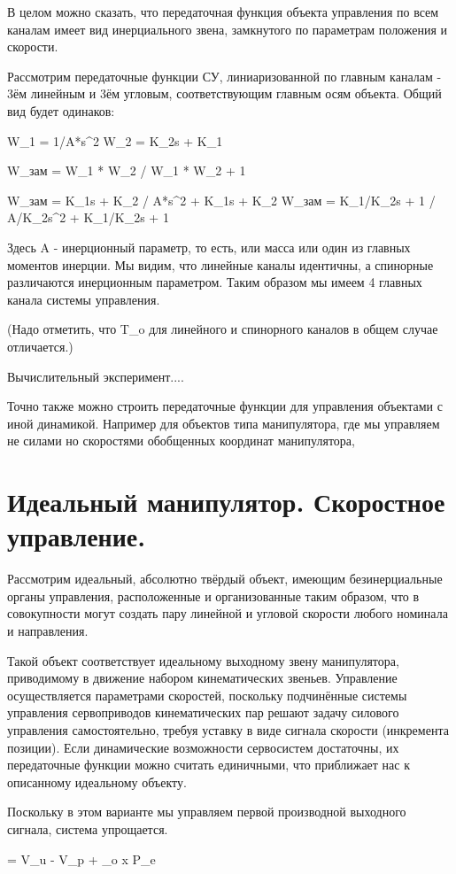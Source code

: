 \documentclass[a4paper]{article}
\begin{document}
В целом можно сказать, что передаточная функция объекта управления по всем каналам имеет вид инерциального звена, замкнутого по параметрам положения и скорости. 

Рассмотрим передаточные функции СУ, линиаризованной по главным каналам - 3ём линейным и 3ём угловым, соответствующим главным осям объекта. 
Общий вид будет одинаков:

W_1 = 1/A*s^2
W_2 = K_2s + K_1

W_зам = W_1 * W_2 / W_1 * W_2 + 1

W_зам = K_1s + K_2 / A*s^2 + K_1s + K_2
W_зам = K_1/K_2s + 1 / A/K_2s^2 + K_1/K_2s + 1

Здесь A - инерционный параметр, то есть, или масса или один из главных моментов инерции. Мы видим, что линейные каналы идентичны, а спинорные различаются инерционным параметром. Таким образом мы имеем 4 главных канала системы управления.

 (Надо отметить, что T_o для линейного и спинорного каналов в общем случае отличается.)

Вычислительный эксперимент....

Точно также можно строить передаточные функции для управления объектами с иной динамикой. Например для объектов типа манипулятора, где мы управляем не силами но скоростями обобщенных координат манипулятора,


\section{Идеальный манипулятор. Скоростное управление.}
Рассмотрим идеальный, абсолютно твёрдый объект, имеющим безинерциальные органы управления, расположенные и организованные таким образом, что в совокупности могут создать пару линейной и угловой скорости любого номинала и направления.

Такой объект соответствует идеальному выходному звену манипулятора, приводимому в движение набором кинематических звеньев. Управление осуществляется параметрами скоростей, поскольку подчинённые системы управления сервоприводов кинематических пар решают задачу силового управления самостоятельно, требуя уставку в виде сигнала скорости (инкремента позиции). Если динамические возможности сервосистем достаточны, их передаточные функции можно считать единичными, что приближает нас к описанному идеальному объекту.

Поскольку в этом варианте мы управляем первой производной выходного сигнала, система упрощается.

 = V_u - V_p + \omega_o x P_e
\end{document}
